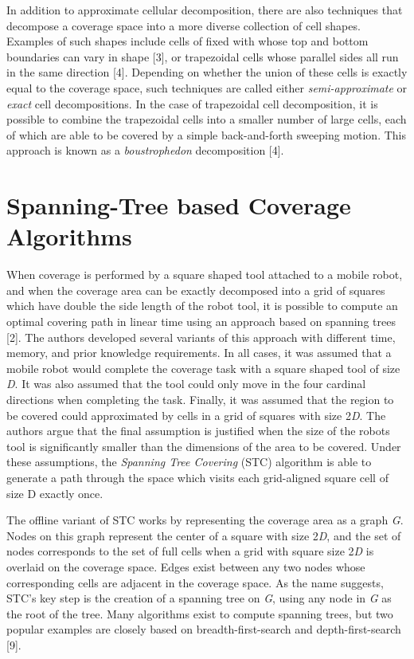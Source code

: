 \documentclass[letterpaper, 12pt, leqno]{report}
\begin{document}
In addition to approximate cellular decomposition, there are also techniques that decompose a coverage space into a more diverse collection of cell shapes. Examples of such shapes include cells of fixed with whose top and bottom boundaries can vary in shape [3], or trapezoidal cells whose parallel sides all run in the same direction [4]. Depending on whether the union of these cells is exactly equal to the coverage space, such techniques are called either \textit{semi-approximate} or \textit{exact} cell decompositions. In the case of trapezoidal cell decomposition, it is possible to combine the trapezoidal cells into a smaller number of large cells, each of which are able to be covered by a simple back-and-forth sweeping motion. This approach is known as a \textit{boustrophedon} decomposition [4].

\section{Spanning-Tree based Coverage Algorithms}

When coverage is performed by a square shaped tool attached to a mobile robot, and when the coverage area can be exactly decomposed into a grid of squares which have double the side length of the robot tool, it is possible to compute an optimal covering path in linear time using an approach based on spanning trees [2]. The authors developed several variants of this approach with different time, memory, and prior knowledge requirements. In all cases, it was assumed that a mobile robot would complete the coverage task with a square shaped tool of size \textit{D}. It was also assumed that the tool could only move in the four cardinal directions when completing the task. Finally, it was assumed that the region to be covered could approximated by cells in a grid of squares with size 2\textit{D}. The authors argue that the final assumption is justified when the size of the robots tool is significantly smaller than the dimensions of the area to be covered. Under these assumptions, the \textit{Spanning Tree Covering} (STC) algorithm is able to generate a path through the space which visits each grid-aligned square cell of size D exactly once.

The offline variant of STC works by representing the coverage area as a graph \textit{G}. Nodes on this graph represent the center of a square with size 2\textit{D}, and the set of nodes corresponds to the set of full cells when a grid with square size 2\textit{D} is overlaid on the coverage space. Edges exist between any two nodes whose corresponding cells are adjacent in the coverage space. As the name suggests, STC's key step is the creation of a spanning tree on \textit{G}, using any node in \textit{G} as the root of the tree. Many algorithms exist to compute spanning trees, but two popular examples are closely based on breadth-first-search and depth-first-search [9].
\end{document}
